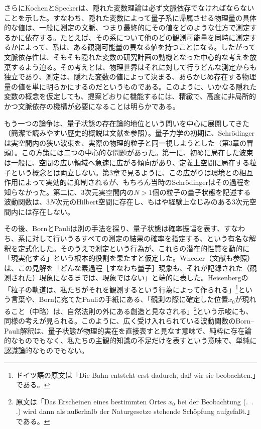 \hypertarget{srcpage:18}{}\label{srcpage:18}
さらにKochenとSpecker\cite{ref038}は、隠れた変数理論は必ず文脈依存でなければならないことを示した。すなわち、隠れた変数によって量子系に帰属させる物理量の具体的な値は、一般に測定の文脈、つまり最終的にその値をどのような仕方で測定するかに依存する。たとえば、その系について他のどの観測可能量を同時に測定するかによって、系は、ある観測可能量の異なる値を持つことになる。したがって文脈依存性は、そもそも隠れた変数の研究計画の動機となった中心的な考えを放棄するよう迫る。その考えとは、物理世界はそれに対して行うどんな測定からも独立であり、測定は、隠れた変数の値によって決まる、あらかじめ存在する物理量の値を単に明らかにするのだというものである。このように、いかなる隠れた変数の概念を仮定しても、提案どおりに機能するには、精緻で、高度に非局所的かつ文脈依存の機構が必要になることは明らかである。

もう一つの論争は、量子状態の存在論的地位という問いを中心に展開してきた（簡潔で読みやすい歴史的概説は文献\cite{ref039}を参照）。量子力学の初期に、Schrödingerは実空間内の狭い波束を、実際の物理的粒子と同一視しようとした（第3章の冒頭）。この方策には二つの中心的な問題があった。第一に、初めに局在した波束は一般に、空間の広い領域へ急速に広がる傾向があり、定義上空間に局在する粒子という概念とは両立しない。第3章で見るように、この広がりは環境との相互作用によって実効的に抑制されるが、もちろん当時のSchrödingerはその過程を知らなかった。第二に、3次元実空間内の$N>1$個の粒子の量子状態を記述する波動関数は、$3N$次元のHilbert空間に存在し、もはや経験上なじみのある3次元空間内には存在しない。

その後、BornとPauliは別の手法を採り、量子状態は確率振幅を表す、すなわち、系に対して行いうるすべての測定の結果の確率を指定する、という有名な解釈を定式化した。そのうえで測定という行為が、これらの潜在的性質を動的に「現実化する」という根本的役割を果たすと仮定した。Wheeler\cite[p.~182]{ref040}（文献\cite{ref041}も参照）は、この見解を「どんな素過程［すなわち量子］現象も、それが記録された（観測された）現象になるまでは、現象ではない」と端的に表した。Heisenbergの「粒子の軌道は、私たちがそれを観測するという行為によって作られる」\footnote{ドイツ語の原文は「Die Bahn entsteht erst dadurch, daß wir sie beobachten.」である。}\cite[p.~185]{ref042}という言葉や、Bornに宛てたPauliの手紙にある、「観測の際に確定した位置$x_0$が現れること（中略）は、自然法則の外にある創造と見なされる」\footnote{原文は「Das Erscheinen eines bestimmten Ortes $x_0$ bei der Beobachtung (.\, .\, .) wird dann als außerhalb der Naturgesetze stehende Schöpfung aufgefaßt.」である。}\cite{ref043}という示唆にも、同様の考えが見られる。このように、広く受け入れられている波動関数のBorn--Pauli解釈は、量子状態が物理的実在を直接表すと見なす意味で、純粋に存在論的なものでもなく、私たちの主観的知識の不足だけを表すという意味で、単純に認識論的なものでもない。


